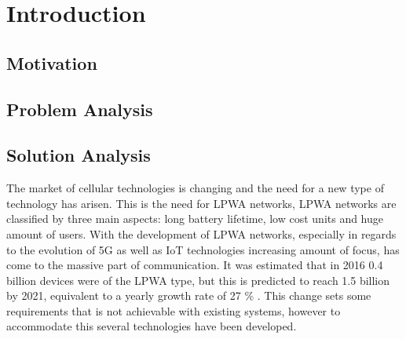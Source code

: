 \chapter{Introduction}\label{ch:Introduction}

\section{Motivation}

\section{Problem Analysis}

\section{Solution Analysis}


The market of cellular technologies is changing and the need for a new type of technology has arisen. This is the need for \gls{LPWA} networks, \gls{LPWA} networks are classified by three main aspects: long battery lifetime, low cost units and huge amount of users. With the development of \gls{LPWA} networks, especially in regards to the evolution of 5G as well as \gls{IoT} technologies increasing amount of focus, has come to the massive part of communication. It was estimated that in 2016 0.4 billion devices were of the \gls{LPWA} type, but this is predicted to reach 1.5 billion by 2021, equivalent to a yearly growth rate of 27 \% \citep{mobi-report}. This change sets some requirements that is not achievable with existing systems, however to accommodate this several technologies have been developed.


